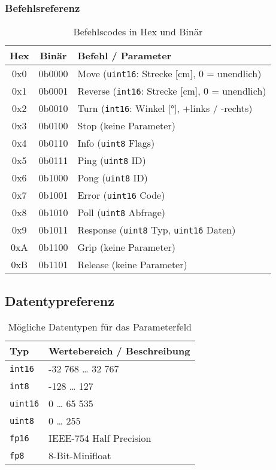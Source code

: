 \documentclass[main.tex]{subfiles} %
\begin{document}
\subsubsection*{Befehlsreferenz}
\begin{table}[h!]
  \centering
  \begin{tabular}{>{\ttfamily}c >{\ttfamily}c l}
    \toprule
    \textnormal{Hex} & \textnormal{Binär} & \textnormal{Befehl / Parameter} \\
    \midrule
    0x0 & 0b0000 & Move (\texttt{uint16}: Strecke [cm], 0 = unendlich) \\
    0x1 & 0b0001 & Reverse (\texttt{int16}: Strecke [cm], 0 = unendlich) \\
    0x2 & 0b0010 & Turn (\texttt{int16}: Winkel [°], +links / -rechts) \\
    0x3 & 0b0100 & Stop (keine Parameter) \\
    0x4 & 0b0110 & Info (\texttt{uint8} Flags) \\
    0x5 & 0b0111 & Ping (\texttt{uint8} ID) \\
    0x6 & 0b1000 & Pong (\texttt{uint8} ID) \\
    0x7 & 0b1001 & Error (\texttt{uint16} Code) \\
    0x8 & 0b1010 & Poll (\texttt{uint8} Abfrage) \\
    0x9 & 0b1011 & Response (\texttt{uint8} Typ, \texttt{uint16} Daten) \\
    0xA & 0b1100 & Grip (keine Parameter) \\
    0xB & 0b1101 & Release (keine Parameter) \\
    \bottomrule
  \end{tabular}
  \caption{Befehlscodes in Hex und Binär}
  \label{tab:cmds}
\end{table}

\subsection*{Datentypreferenz}
\begin{table}[h!]
  \centering
  \begin{tabular}{l l}
    \toprule
    \textbf{Typ} & \textbf{Wertebereich / Beschreibung} \\
    \midrule
    \texttt{int16} & -32 768 … 32 767 \\
    \texttt{int8}  & -128 … 127 \\
    \texttt{uint16} & 0 … 65 535 \\
    \texttt{uint8}  & 0 … 255 \\
    \texttt{fp16}   & IEEE-754 Half Precision \\
    \texttt{fp8}    & 8-Bit-Minifloat \\
    \bottomrule
  \end{tabular}
  \caption{Mögliche Datentypen für das Parameterfeld}
  \label{tab:types}
\end{table}
\end{document}
